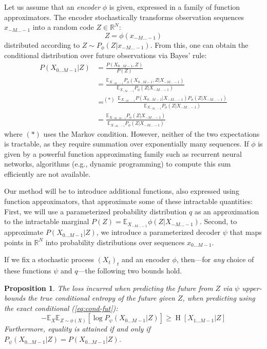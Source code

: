 \documentclass[11pt,letterpaper]{article}
\newcommand{\E}[0]{\mathbb{E}}
\newcounter{theorem}
\newtheorem{proposition}[theorem]{Proposition}
\begin{document}
Let us assume that an \emph{encoder} $\phi$ is given, expressed in a family of function approximators. 
The encoder stochastically transforms observation sequences $x_{-M\dots -1}$ into a random code $Z \in \mathbb{R}^N$: 
\begin{equation}
Z = \phi(x_{-M\dots -1})
\end{equation}
distributed according to $Z \sim P_\phi(Z|x_{-M\dots -1})$.
From this, one can obtain the conditional distribution over future observations via Bayes' rule: %
\begin{equation}
	\label{eq:cond-fut}
	\begin{split}
	P(X_{0\dots M-1}|Z) &= \frac{P(X_{0\dots M-1}, Z)}{P(Z)} \\
	&= \frac{\E_{X_{-M \dots -1}} P_\phi(X_{0\dots M-1}, Z|X_{-M\dots-1})}{\E_{X_{-M \dots -1}} P_\phi(Z|X_{-M \dots -1})} \\
	&=^{(*)} \frac{\E_{X_{-M \dots -1}}   P(X_{0\dots M-1}|X_{-M\dots-1})     P_\phi(Z|X_{-M\dots-1})}{\E_{X_{-M \dots -1}} P_\phi(Z|X_{-M \dots -1})} \\
	&= \frac{\E_{X_{-M \dots M-1}} P_\phi(Z|X_{-M\dots-1})}{\E_{X_{-M \dots -1}} P_\phi(Z|X_{-M \dots -1})}
	\end{split}
\end{equation}
where $(*)$ uses the Markov condition.
However, neither of the two expectations is tractable, as they require summation over exponentially many sequences.
If $\phi$ is given by a powerful function approximating family such as recurrent neural networks, algorithms (e.g., dynamic programming) to compute this sum efficiently are not available.

Our method will be to introduce additional functions, also expressed using function approximators, that approximate some of these intractable quantities:
First, we will use a parameterized probability distribution $q$ as an approximation to the intractable marginal $P(Z) = \E_{X_{-M \dots -1}} \phi(Z|X_{-M \dots -1})$.
Second, to approximate $P(X_{0\dots M-1}|Z)$, we introduce a parameterized decoder $\psi$ that maps points in $\mathbb{R}^N$  into probability distributions over sequences $x_{0\dots M-1}$.

If we fix a stochastic process $(X_t)_t$ and an encoder $\phi$, then---for \emph{any} choice of these functions $\psi$ and $q$---the following two bounds hold.

\begin{proposition}
The loss incurred when predicting the future from $Z$ via $\psi$ upper-bounds the true conditional entropy of the future given $Z$, when predicting using the exact conditional (\ref{eq:cond-fut}):
\begin{equation}\label{ineq1}
	-	\mathbb{E}_{X}\mathbb{E}_{Z \sim \phi(X)}\left[\log P_\psi(X_{0\dots M-1} | Z)\right] \geq \operatorname{H}[X_{1\dots M-1}|Z]
\end{equation}
Furthermore, equality is attained if and only if $P_\psi(X_{0\dots M-1}|Z) = P(X_{0\dots M-1}|Z)$. %
\end{proposition}
\end{document}
